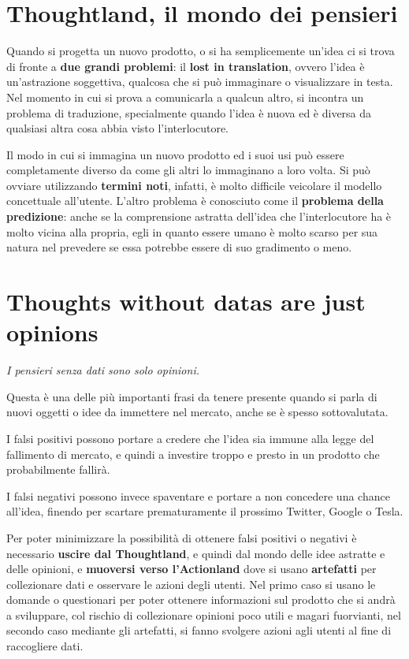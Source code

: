 \documentclass[a4paper,11pt,oneside]{book}
\begin{document}
\section{Thoughtland, il mondo dei pensieri}
Quando si progetta un nuovo prodotto, o si ha semplicemente un'idea ci si trova di fronte a \textbf{due grandi problemi}: il \textbf{lost in translation}, ovvero l'idea è un'astrazione soggettiva, qualcosa che si può immaginare o visualizzare in testa. Nel momento in cui si prova a comunicarla a qualcun altro, si incontra un problema
di traduzione, specialmente quando l'idea è nuova ed è diversa da qualsiasi altra cosa
abbia visto l'interlocutore.

Il modo in cui si immagina un nuovo prodotto ed i suoi usi può essere completamente diverso da come gli altri lo immaginano a loro volta. Si può ovviare utilizzando \textbf{termini noti}, infatti, è molto difficile veicolare il modello concettuale all'utente. L'altro problema è conosciuto come il \textbf{problema della predizione}: anche se la comprensione astratta dell'idea che l'interlocutore ha è molto vicina alla propria, egli in quanto essere umano è molto scarso per sua natura nel prevedere se essa potrebbe essere di suo gradimento o meno.

\pagebreak

\section{Thoughts without datas are just opinions}

\begin{flushleft}
	\textit{I pensieri senza dati sono solo opinioni.}
\end{flushleft}

Questa è una delle più importanti frasi da tenere presente quando si parla di nuovi oggetti o idee da immettere nel mercato, anche se è spesso sottovalutata.

I falsi positivi possono portare a credere che l'idea sia immune alla legge del
fallimento di mercato, e quindi a investire troppo e presto in un prodotto che probabilmente fallirà.

I falsi negativi possono invece spaventare e portare a non concedere una chance all'idea, finendo per scartare prematuramente il prossimo Twitter, Google o Tesla.

Per poter minimizzare la possibilità di ottenere falsi positivi o negativi è necessario \textbf{uscire dal Thoughtland}, e quindi dal mondo delle idee astratte e delle opinioni, e \textbf{muoversi verso l'Actionland} dove si usano \textbf{artefatti} per collezionare dati e osservare le azioni degli utenti. Nel primo caso si usano le domande o questionari per poter ottenere informazioni sul prodotto
che si andrà a sviluppare, col rischio di collezionare opinioni poco utili e magari fuorvianti, nel secondo caso mediante gli artefatti, si fanno svolgere azioni agli utenti al fine di raccogliere dati.
\end{document}
